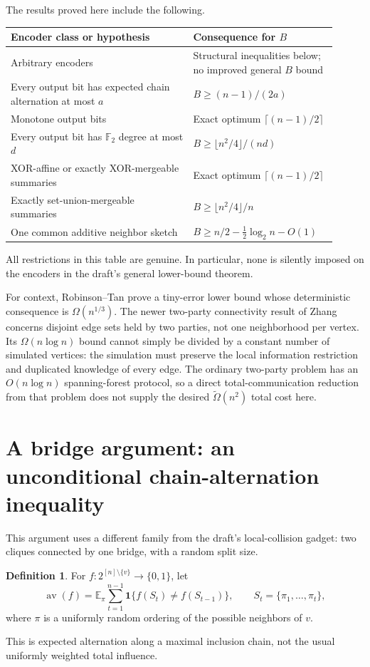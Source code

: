 \documentclass[11pt]{article}
\theoremstyle{definition}\newtheorem{definition}[theorem]{Definition}
\theoremstyle{remark}\newtheorem{remark}[theorem]{Remark}
\newcommand{\F}{\mathbb F}
\newcommand{\E}{\mathbb E}
\newcommand{\av}{\operatorname{av}}
\begin{document}
The results proved here include the following.
\begin{center}\small
\begin{tabular}{@{}p{0.52\linewidth}p{0.39\linewidth}@{}}
\toprule
Encoder class or hypothesis & Consequence for $B$\\
\midrule
Arbitrary encoders & Structural inequalities below; no improved general $B$ bound\\
Every output bit has expected chain alternation at most $a$ & $B\ge(n-1)/(2a)$\\
Monotone output bits & Exact optimum $\lceil(n-1)/2\rceil$\\
Every output bit has $\F_2$ degree at most $d$ & $B\ge\lfloor n^2/4\rfloor/(nd)$\\
XOR-affine or exactly XOR-mergeable summaries & Exact optimum $\lceil(n-1)/2\rceil$\\
Exactly set-union-mergeable summaries & $B\ge\lfloor n^2/4\rfloor/n$\\
One common additive neighbor sketch & $B\ge n/2-\tfrac12\log_2n-O(1)$\\
\bottomrule
\end{tabular}\end{center}
All restrictions in this table are genuine. In particular, none is silently imposed on the encoders in the draft's general lower-bound theorem.

For context, Robinson--Tan \cite{RT26} prove a tiny-error lower bound whose deterministic consequence is $\Omega(n^{1/3})$. The newer two-party connectivity result of Zhang \cite{Z26} concerns disjoint edge sets held by two parties, not one neighborhood per vertex. Its $\Omega(n\log n)$ bound cannot simply be divided by a constant number of simulated vertices: the simulation must preserve the local information restriction and duplicated knowledge of every edge. The ordinary two-party problem has an $O(n\log n)$ spanning-forest protocol, so a direct total-communication reduction from that problem does not supply the desired $\widetilde\Omega(n^2)$ total cost here.

\section{A bridge argument: an unconditional chain-alternation inequality}
This argument uses a different family from the draft's local-collision gadget: two cliques connected by one bridge, with a random split size.

\begin{definition}
For $f:2^{[n]\setminus\{v\}}\to\{0,1\}$, let
\[
 \av(f)=\E_\pi\sum_{t=1}^{n-1}
 \mathbf1\{f(S_t)\ne f(S_{t-1})\},
 \qquad S_t=\{\pi_1,\ldots,\pi_t\},
\]
where $\pi$ is a uniformly random ordering of the possible neighbors of $v$.
\end{definition}
This is expected alternation along a maximal inclusion chain, not the usual uniformly weighted total influence.
\end{document}
